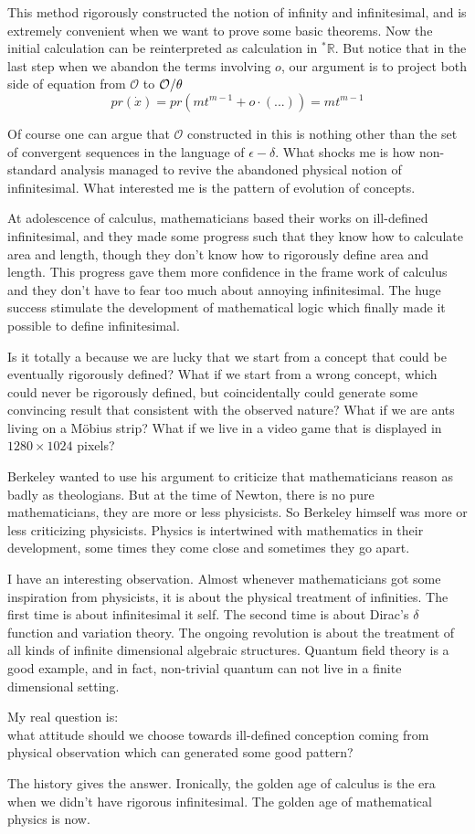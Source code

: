 \documentclass[11pt]{article}
\begin{document}
This method rigorously constructed the notion of infinity and infinitesimal, and is extremely convenient when we want to prove some basic theorems. Now the initial calculation can be reinterpreted as calculation in $^*\mathbb{R}$. But notice that in the last step when we abandon the terms involving $o$, our argument is to project both side of equation from $\mathcal{O}$ to ${\cal O}/\theta$
$$
pr(\dot{x})=pr(m t^{m-1}+o\cdot (...))=mt^{m-1}
$$

Of course one can argue that $\mathcal{O}$ constructed in this is nothing other than the set of convergent sequences in the language of $\epsilon-\delta$. What shocks me is how non-standard analysis managed to revive the abandoned physical notion of infinitesimal. What interested me is the pattern of evolution of concepts.

At adolescence of calculus, mathematicians based their works on ill-defined infinitesimal, and they made some progress such that they know how to calculate area and length, though they don't know how to rigorously define area and length.
  This progress gave them more confidence in the frame work of calculus and they don't have to fear too much about annoying infinitesimal. 
The huge success stimulate the development of mathematical logic which finally made it possible to define infinitesimal.
  
Is it totally a because we are lucky that we start from a concept that could be eventually rigorously defined? 
What if we start from a wrong concept, which could never be rigorously defined, but coincidentally could generate some convincing result that consistent with the observed nature? What if we are ants living on a Möbius strip? What if we live in a video game that is displayed in $1280\times1024$ pixels? 

Berkeley wanted to use his argument to criticize that mathematicians reason as badly as theologians. But at the time of Newton, there is no pure mathematicians, they are more or less physicists. So Berkeley himself was more or less criticizing physicists. Physics is intertwined with mathematics in their development, some times they come close and sometimes they go apart. 

I have an interesting observation. Almost whenever mathematicians got some inspiration from physicists, it is  about the physical treatment of infinities. The first time is about infinitesimal it self. The second time is about Dirac's $\delta$ function and variation theory. The ongoing revolution is about the treatment of all kinds of infinite dimensional algebraic structures. Quantum field theory is a good example, and in fact, non-trivial quantum can not live in a finite dimensional setting.

My real question is:\\
what attitude should we choose towards ill-defined conception coming from physical observation which can generated some good pattern?

The history gives the answer. Ironically, the golden age of calculus is the era when we didn't have rigorous infinitesimal. The golden age of mathematical physics is now.
\end{document}
